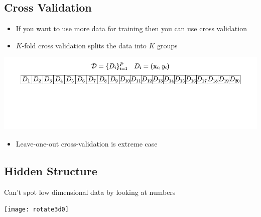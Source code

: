 \begin{slide}
  \section[-2]{Cross Validation}
  
\pb
\begin{itemize}
\item If you want to use more data for training then you can use cross
  validation\pauseh
\item $K$-fold cross validation splits the data into $K$ groups\pauseh
\end{itemize}
\begin{center}
  \includegraphics[width=0.9\linewidth]{cross_validation0}
\end{center}
\begin{itemize}
\item Leave-one-out cross-validation is extreme case\pause
\end{itemize}
\end{slide}




\begin{slide}
\section[-2]{Hidden Structure}

\pb
Can't spot low dimensional data by looking at numbers\pause
\begin{center}
  \texttt{[image: rotate3d0]}
\end{center}

\end{slide}


